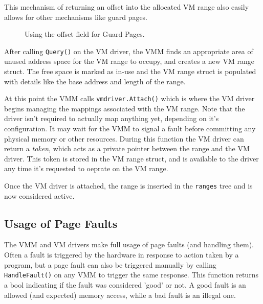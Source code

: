 This mechanism of returning an offset into the allocated VM range also easily allows for other mechanisms like guard pages.

\begin{figure}[h]
\centering
{}
\caption{Using the offset field for Guard Pages.}
\end{figure}

After calling \verb|Query()| on the VM driver, the VMM finds an appropriate area of unused address space for the VM range to occupy, and creates a new VM range struct. The free space is marked as in-use and the VM range struct is populated with details like the base address and length of the range.

At this point the VMM calls \verb|vmdriver.Attach()| which is where the VM driver begins managing the mappings associated with the VM range. Note that the driver isn't required to actually map anything yet, depending on it's configuration. It may wait for the VMM to signal a fault before committing any physical memory or other resources. During this function the VM driver can return a \textit{token}, which acts as a private pointer between the range and the VM driver. This token is stored in the VM range struct, and is available to the driver any time it's requested to oeprate on the VM range.

Once the VM driver is attached, the range is inserted in the \verb|ranges| tree and is now considered active.

\subsection{Usage of Page Faults}
The VMM and VM drivers make full usage of page faults (and handling them). Often a fault is triggered by the hardware in response to action taken by a program, but a page fault can also be triggered manually by calling \verb|HandleFault()| on any VMM to trigger the same response. This function returns a bool indicating if the fault was considered 'good' or not. A good fault is an allowed (and expected) memory access, while a bad fault is an illegal one.

